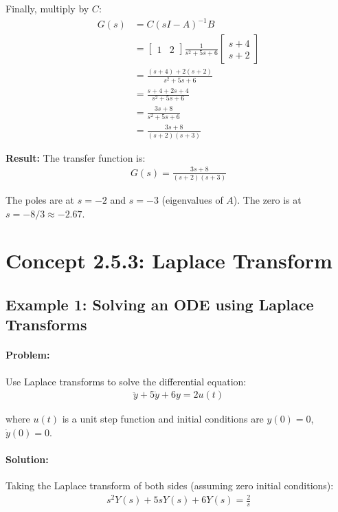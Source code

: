 \documentclass[11pt,a4paper]{article}
\begin{document}
Finally, multiply by $C$:
\begin{align}
G(s) &= C(sI-A)^{-1}B \\
&= \begin{bmatrix} 1 & 2 \end{bmatrix}\frac{1}{s^2+5s+6}\begin{bmatrix} s+4 \\ s+2 \end{bmatrix} \\
&= \frac{(s+4) + 2(s+2)}{s^2+5s+6} \\
&= \frac{s+4+2s+4}{s^2+5s+6} \\
&= \frac{3s+8}{s^2+5s+6} \\
&= \frac{3s+8}{(s+2)(s+3)}
\end{align}

\textbf{Result:} The transfer function is:
\begin{align}
G(s) = \frac{3s+8}{(s+2)(s+3)}
\end{align}

The poles are at $s = -2$ and $s = -3$ (eigenvalues of $A$).
The zero is at $s = -8/3 \approx -2.67$.

\section{Concept 2.5.3: Laplace Transform}

\subsection{Example 1: Solving an ODE using Laplace Transforms}

\paragraph{Problem:} Use Laplace transforms to solve the differential equation:
\begin{align}
\ddot{y} + 5\dot{y} + 6y = 2u(t)
\end{align}

where $u(t)$ is a unit step function and initial conditions are $y(0) = 0$, $\dot{y}(0) = 0$.

\paragraph{Solution:}

Taking the Laplace transform of both sides (assuming zero initial conditions):
\begin{align}
s^2Y(s) + 5sY(s) + 6Y(s) = \frac{2}{s}
\end{align}
\end{document}
